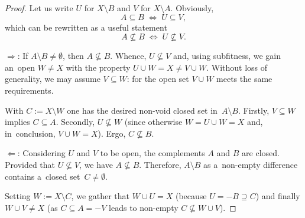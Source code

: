\begin{proof}
  Let us write $U$ for $X\setminus B$ and $V$ for $X\setminus A$.
  Obviously,
  \[
    A\subseteq B \; \Leftrightarrow \; U\subseteq V,
  \]
  which can be rewritten as a useful statement
  \[
    A\not\subseteq B \; \Leftrightarrow \; U\not\subseteq V.
  \]

  $\Rightarrow$: If $A\setminus B \ne \emptyset$, then $A\not\subseteq B$.
  Whence, $U\not\subseteq V$ and, using subfitness, we gain an~open $W \ne X$
  with the property $U \cup W = X \ne V \cup W$. 
  Without loss of generality, we may assume $V\subseteq W$: for the open set $V
  \cup W$ meets the same requirements.

  With $C := X \setminus W$ one has the desired non-void closed set
  in~$A\setminus B$.
  Firstly, $V\subseteq W$ implies $C\subseteq A$.
  Secondly, $U\not\subseteq W$ (since otherwise $W = U \cup W = X$ and,
  in~conclusion, $V \cup W = X$).
  Ergo, $C\not\subseteq B$.

  $\Leftarrow$: Considering $U$ and $V$ to be open, the complements $A$ and $B$
  are closed.
  Provided that $U\not\subseteq V$, we have $A\not\subseteq B$.
  Therefore, $A \setminus B$ as a~non-empty difference contains a~closed
  set~$C \ne \emptyset$.

  Setting $W := X \setminus C$, we gather that $W \cup U = X$ (because $U =
  \minus B \supseteq C$) and finally $W \cup V \ne X$ (as $C\subseteq A =
  \minus V$ leads to non-empty $C\not\subseteq W \cup V$).
\end{proof}
